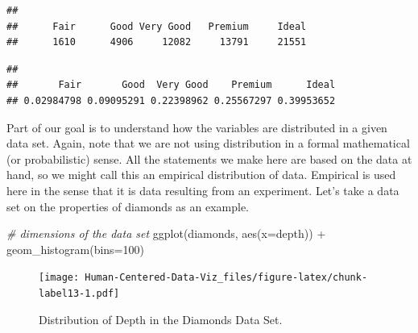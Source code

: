 \documentclass[
]{book}
\newenvironment{Shaded}{\begin{snugshade}}{\end{snugshade}}
\newcommand{\AttributeTok}[1]{\textcolor[rgb]{0.77,0.63,0.00}{#1}}
\newcommand{\CommentTok}[1]{\textcolor[rgb]{0.56,0.35,0.01}{\textit{#1}}}
\newcommand{\DecValTok}[1]{\textcolor[rgb]{0.00,0.00,0.81}{#1}}
\newcommand{\FunctionTok}[1]{\textcolor[rgb]{0.00,0.00,0.00}{#1}}
\newcommand{\NormalTok}[1]{#1}
\newcommand{\SpecialCharTok}[1]{\textcolor[rgb]{0.00,0.00,0.00}{#1}}
\begin{document}
\begin{Shaded}
\end{Shaded}

\begin{verbatim}
## 
##      Fair      Good Very Good   Premium     Ideal 
##      1610      4906     12082     13791     21551
\end{verbatim}

\begin{Shaded}
\end{Shaded}

\begin{verbatim}
## 
##       Fair       Good  Very Good    Premium      Ideal 
## 0.02984798 0.09095291 0.22398962 0.25567297 0.39953652
\end{verbatim}

Part of our goal is to understand how the variables are distributed in a given data set. Again, note that we are not using distribution in a formal mathematical (or probabilistic) sense. All the statements we make here are based on the data at hand, so we might call this an empirical distribution of data. Empirical is used here in the sense that it is data resulting from an experiment. Let's take a data set on the properties of diamonds as an example.

\begin{Shaded}
\begin{Highlighting}[]
\CommentTok{\# dimensions of the data set}
\FunctionTok{ggplot}\NormalTok{(diamonds, }\FunctionTok{aes}\NormalTok{(}\AttributeTok{x=}\NormalTok{depth)) }\SpecialCharTok{+} \FunctionTok{geom\_histogram}\NormalTok{(}\AttributeTok{bins=}\DecValTok{100}\NormalTok{)}
\end{Highlighting}
\end{Shaded}

\begin{figure}
\centering
\texttt{[image: Human-Centered-Data-Viz\_files/figure-latex/chunk-label13-1.pdf]}
\caption{\label{fig:chunk-label13}Distribution of Depth in the Diamonds Data Set.}
\end{figure}
\end{document}
